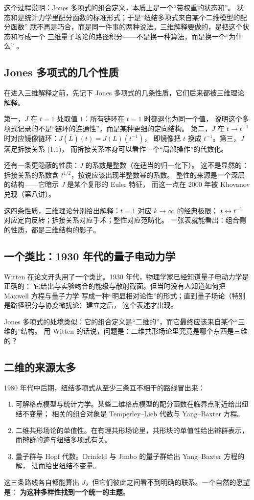 这个过程说明：Jones 多项式的组合定义，本质上是一个“带权重的状态和”。
状态和是统计力学里配分函数的标准形式；于是“纽结多项式来自某个二维模型的配分函数”
就不再是巧合，而是同一件事的两种说法。三维解释要做的，是把这个状态和写成一个
三维量子场论的路径积分——不是换一种算法，而是换一个“为什么” 。

\subsection{Jones 多项式的几个性质}

在进入三维解释之前，先记下 Jones 多项式的几条性质，它们后来都被三维理论解释。

第一，$J$ 在 $t=1$ 处取值 $1$：所有链环在 $t=1$ 时都退化为同一个值，
说明这个多项式记录的不是“链环的连通性”，而是某种更细的定向结构。
第二，$J$ 在 $t\to t^{-1}$ 时对应镜像链环：$J(\bar L)(t)=J(L)(t^{-1})$，
即镜像把 $t$ 换成 $t^{-1}$。第三，$J$ 满足拆接关系 (1.1)，
而拆接关系本身可以看作一个“局部操作”的代数化。

还有一条更隐蔽的性质：$J$ 的系数是整数（在适当的归一化下）。
这不是显然的：拆接关系的系数含 $t^{1/2}$，按说应该出现半整数幂的系数。
整性的来源是一个深层的结构——它暗示 $J$ 是某个复形的 Euler 特征，
而这一点在 2000 年被 Khovanov 兑现（第八讲）。

这四条性质，三维理论分别给出解释：$t=1$ 对应 $k\to\infty$ 的经典极限；
$t\leftrightarrow t^{-1}$ 对应定向反转；拆接关系对应手术；整性对应范畴化。
一张表就能看出：组合侧的性质，都是三维结构的影子。

\subsection{一个类比：1930 年代的量子电动力学}

Witten 在论文开头用了一个类比。1930 年代，物理学家已经知道量子电动力学是正确的：
它给出与实验吻合的能级与散射截面。但当时没有人知道如何把 Maxwell 方程与量子力学
写成一种“明显相对论性”的形式；直到量子场论（特别是路径积分与协变微扰论）建立之后，
这个表述才出现。

Jones 多项式的处境类似：它的组合定义是“二维的”，而它最终应该来自某个“三维的”结构。
用 Witten 的话说，问题是：二维共形场论里究竟是哪个东西是三维的？

\subsection{二维的来源太多}

1980 年代中后期，纽结多项式从至少三条互不相干的路线冒出来：
\begin{enumerate}[leftmargin=*]
  \item 可解格点模型与统计力学。某些二维格点模型的配分函数在临界点附近给出纽结不变量；
        相关的组合对象是 Temperley--Lieb 代数与 Yang--Baxter 方程。
  \item 二维共形场论的单值性。在有理共形场论里，共形块的单值性给出辫群表示，
        而辫群的迹与纽结多项式有关。
  \item 量子群与 Hopf 代数。Drinfeld 与 Jimbo 的量子群给出 Yang--Baxter 方程的解，
        进而给出纽结不变量。
\end{enumerate}
这三条路线各自都能算出 $J$，但它们彼此之间看不到明确的联系。一个自然的愿望是：
\textbf{为这种多样性找到一个统一的主题}。

